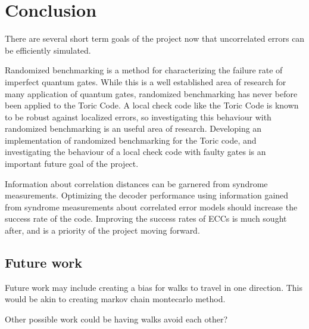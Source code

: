 \chapter{Conclusion}

	There are several short term goals of the project now that uncorrelated errors can be efficiently simulated. 
	
	Randomized benchmarking is a method for characterizing the failure rate of imperfect quantum gates. While this is a well established area of research for many application of quantum gates, randomized benchmarking has never before been applied to the Toric Code. A local check code like the Toric Code is known to be robust against localized errors, so investigating this behaviour with randomized benchmarking is an useful area of research. Developing an implementation of randomized benchmarking for the Toric code, and investigating the behaviour of a local check code with faulty gates is an important future goal of the project.
	
	Information about correlation distances can be garnered from syndrome measurements. Optimizing the decoder performance using information gained from syndrome measurements about correlated error models should increase the success rate of the code. Improving the success rates of ECCs is much sought after, and is a priority of the project moving forward. 
	
	\section{Future work}
	
	Future work may include creating a bias for walks to travel in one direction. This would be akin to creating markov chain montecarlo method.
	
	 Other possible work could be having walks avoid each other? 